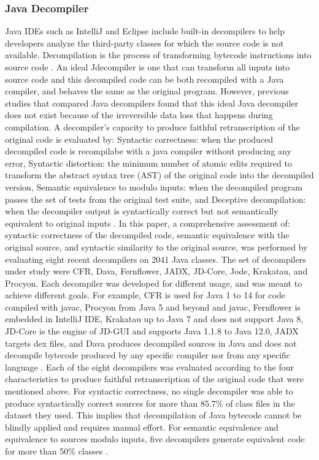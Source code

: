 \documentclass[conference,a4paper]{IEEEtran}
\begin{document}
\subsubsection{Java Decompiler}
Java IDEs such as IntelliJ and Eclipse include built-in decompilers to help developers analyze the third-party classes for which the source code is not available. Decompilation is the process of transforming bytecode instructions into source code \cite{harrand_java_2020}. An ideal Jdecompiler is one that can transform all inputs into source code and this decompiled code can be both recompiled with a Java compiler, and behaves the same as the original program. However, previous studies that compared Java decompilers found that this ideal Java decompiler does not exist because of the irreversible data loss that happens during compilation.
A decompiler’s capacity to produce faithful retranscription of the original code is evaluated by: Syntactic correctness: when the produced decompiled code is recompilabe with a java compiler without producing any error, Syntactic distortion: the minimum number of atomic edits required to transform the abstract syntax tree (AST) of the original code into the decompiled version, Semantic equivalence to modulo inputs: when the decompiled program passes the set of tests from the original test suite, and Deceptive decompilation: when the decompiler output is syntactically correct but not semantically equivalent to original inputs \cite{harrand_java_2020}.
In this paper, a comprehensive assessment of: syntactic correctness of the decompiled code, semantic equivalence with the original source, and syntactic similarity to the original source, was performed by evaluating eight recent decompilers on 2041 Java classes. The set of decompilers under study were CFR, Dava, Fernflower, JADX, JD-Core, Jode, Krakatau, and Procyon. Each decompiler was developed for different usage, and was meant to achieve different goals. For example, CFR is used for Java 1 to 14 for code compiled with javac, Procyon from Java 5 and beyond and javac, Fernflower is embedded in IntelliJ IDE, Krakatau up to Java 7 and does not support Java 8, JD-Core is the engine of JD-GUI and supports Java 1.1.8 to Java 12.0, JADX targets dex files, and Dava produces decompiled sources in Java and does not decompile bytecode produced by any specific compiler nor from any specific language \cite{harrand_java_2020}.
Each of the eight decompilers was evaluated according to the four characteristics to produce faithful retranscription of the original code that were mentioned above. For syntactic correctness, no single decompiler was able to produce syntactically correct sources for more than 85.7\% of class files in the dataset they used. This implies that decompilation of Java bytecode cannot be blindly applied and requires manual effort. For semantic equivalence and equivalence to sources modulo inputs, five decompilers generate equivalent code for more than 50\% classes \cite{harrand_java_2020}.
\end{document}

